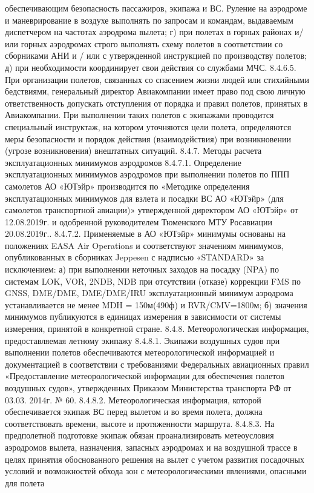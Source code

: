 обеспечивающим безопасность пассажиров, экипажа и ВС. Руление на аэродроме и маневрирование в воздухе выполнять по запросам и командам, выдаваемым диспетчером на частотах аэродрома вылета;
г)	при полетах в горных районах и/или горных аэродромах строго выполнять схему полетов в соответствии со сборниками АНИ и / или с утвержденной инструкцией по производству полетов; 
д)	при необходимости координирует свои действия со службами МЧС. 
8.4.6.5. При организации полетов, связанных со спасением жизни людей или стихийными бедствиями, генеральный директор Авиакомпании имеет право под свою личную ответственность допускать отступления от порядка и правил полетов, принятых в Авиакомпании. При выполнении таких полетов с экипажами проводится специальный инструктаж, на котором уточняются цели полета, определяются меры безопасности и порядок действия (взаимодействия) при возникновении (угрозе возникновения) внештатных ситуаций.
8.4.7. Методы расчета эксплуатационных минимумов аэродромов
8.4.7.1. Определение эксплуатационных минимумов аэродромов при выполнении полетов по ППП самолетов АО «ЮТэйр» производится по «Методике определения эксплуатационных минимумов для взлета и посадки ВС АО «ЮТэйр» (для самолетов транспортной авиации)» утвержденной директором АО «ЮТэйр» от 12.08.2019г. и одобренной руководителем Тюменского МТУ Росавиации 20.08.2019г..
8.4.7.2. Применяемые в АО «ЮТэйр» минимумы основаны на положениях EASA Air Operations и соответствуют значениям минимумов, опубликованных в сборниках Jeppesen с надписью «STANDARD» за исключением:
а)	при выполнении неточных заходов на посадку (NPA) по системам LOK, VOR, 2NDB, NDB при отсутствии (отказе) коррекции FMS по GNSS, DME/DME, DME/DME/IRU эксплуатационный минимум аэродрома устанавливается не менее MDH = 150м(490ф) и RVR/CMV=1800м;
б)	значения минимумов публикуются в единицах измерения в зависимости от системы измерения, принятой в конкретной стране.
8.4.8. Метеорологическая информация, предоставляемая летному экипажу
8.4.8.1. Экипажи воздушных судов при выполнении полетов обеспечиваются метеорологической информацией и документацией в соответствии с требованиями Федеральных авиационных правил «Предоставление метеорологической информации для обеспечения полетов воздушных судов», утвержденных Приказом Министерства транспорта РФ от 03.03. 2014г. № 60.
8.4.8.2. Метеорологическая информация, которой обеспечивается экипаж ВС перед вылетом и во время полета, должна соответствовать времени, высоте и протяженности маршрута.
8.4.8.3. На предполетной подготовке экипаж обязан проанализировать метеоусловия аэродромов вылета, назначения, запасных аэродромах и на воздушной трассе в целях принятия обоснованного решения на вылет с учетом развития посадочных условий и возможностей обхода зон с метеорологическими явлениями, опасными для полета
